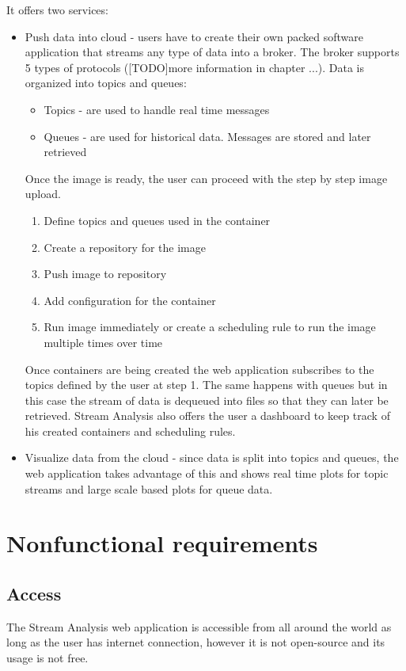 It offers two services:
\begin{itemize}
	\item Push data into cloud - users have to create their own packed software application that streams any type of data into a broker. The broker supports 5 types of protocols ([TODO]more information in chapter ...). Data is organized into topics and queues:
	\begin{itemize}
		\item Topics - are used to handle real time messages
		\item Queues - are used for historical data. Messages are stored and later retrieved
	\end{itemize}
	Once the image is ready, the user can proceed with the step by step image upload. 
	\begin{enumerate}
		\item Define topics and queues used in the container
		\item Create a repository for the image
		\item Push image to repository
		\item Add configuration for the container
		\item Run image immediately or create a scheduling rule to run the image multiple times over time
	\end{enumerate}
	Once containers are being created the web application subscribes to the topics defined by the user at step 1. The same happens with queues but in this case the stream of data is dequeued into files so that they can later be retrieved.
	Stream Analysis also offers the user a dashboard to keep track of his created containers and scheduling rules.
	\item Visualize data from the cloud - since data is split into topics and queues, the web application takes advantage of this and shows real time plots for topic streams and large scale based plots for queue data.
\end{itemize}

\section{Nonfunctional requirements}
\label{chap:02:01}

\subsection{Access}
\label{chap:02:01:01}
The Stream Analysis web application is accessible from all around the world as long as the user has internet connection, however it is not open-source and its usage is not free.\\

